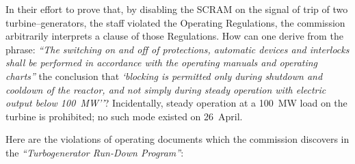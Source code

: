 \documentclass[openright]{bookest}
\begin{document}
In their effort to prove that, by disabling the SCRAM on the signal of trip of two turbine--generators, the staff violated the Operating Regulations, the commission arbitrarily interprets a clause of those Regulations. How can one derive from the phrase: \textit{``The switching on and off of protections, automatic devices and interlocks shall be performed in accordance with the operating manuals and operating charts''} the conclusion that \textit{`blocking is permitted only during shutdown and cooldown of the reactor, and not simply during steady operation with electric output below \qty{100}{\mega\watt}''}? Incidentally, steady operation at a \qty{100}{\mega\watt} load on the turbine is prohibited; no such mode existed on 26~April.

Here are the violations of operating documents which the commission discovers in the \textit{``Turbogenerator Run-Down Program''}:
\end{document}
